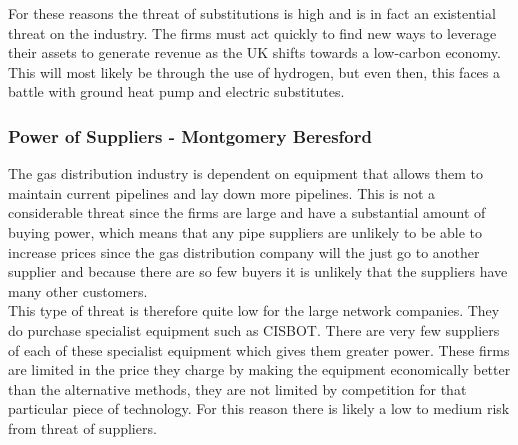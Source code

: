 \documentclass[11pt]{article}		%
\begin{document}
                For these reasons the threat of substitutions is high and is in fact an existential threat on the industry. The firms must act quickly to find new ways to leverage their assets to generate revenue as the UK shifts towards a low-carbon economy. This will most likely be through the use of hydrogen, but even then, this faces a battle with ground heat pump and electric substitutes.

     
		\subsubsection[Power of Suppliers]{Power of Suppliers - Montgomery Beresford}
		        The gas distribution industry is dependent on equipment that allows them to maintain current pipelines and lay down more pipelines. 
		        This is not a considerable threat since the firms are large and have a substantial amount of buying power, which means that any pipe suppliers are unlikely to be able to increase prices since the gas distribution company will the just go to another supplier and because there are so few buyers it is unlikely that the suppliers have many other customers. 
		        \\
		        This type of threat is therefore quite low for the large network companies.
                They do purchase specialist equipment such as CISBOT. There are very few suppliers of each of these specialist equipment which gives them greater power. These firms are limited in the price they charge by making the equipment economically better than the alternative methods, they are not limited by competition for that particular piece of technology.
                For this reason there is likely a low to medium risk from threat of suppliers.

		
\end{document}
